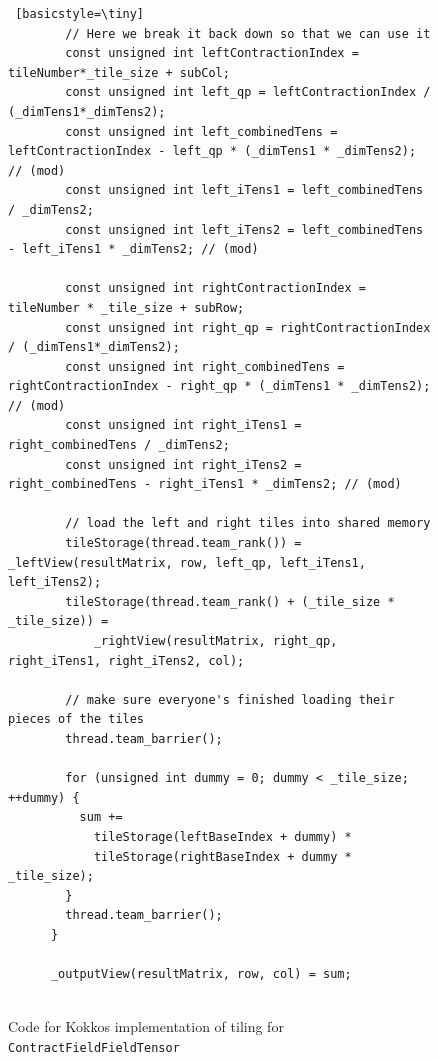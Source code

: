 \begin{figure}[H]
\begin{lstlisting} [basicstyle=\tiny]
        // Here we break it back down so that we can use it
        const unsigned int leftContractionIndex = tileNumber*_tile_size + subCol;
        const unsigned int left_qp = leftContractionIndex / (_dimTens1*_dimTens2);
        const unsigned int left_combinedTens = leftContractionIndex - left_qp * (_dimTens1 * _dimTens2); // (mod)
        const unsigned int left_iTens1 = left_combinedTens / _dimTens2;
        const unsigned int left_iTens2 = left_combinedTens - left_iTens1 * _dimTens2; // (mod)

        const unsigned int rightContractionIndex = tileNumber * _tile_size + subRow; 
        const unsigned int right_qp = rightContractionIndex / (_dimTens1*_dimTens2);
        const unsigned int right_combinedTens = rightContractionIndex - right_qp * (_dimTens1 * _dimTens2); // (mod)
        const unsigned int right_iTens1 = right_combinedTens / _dimTens2;
        const unsigned int right_iTens2 = right_combinedTens - right_iTens1 * _dimTens2; // (mod)

        // load the left and right tiles into shared memory
        tileStorage(thread.team_rank()) = _leftView(resultMatrix, row, left_qp, left_iTens1, left_iTens2);
        tileStorage(thread.team_rank() + (_tile_size * _tile_size)) =
            _rightView(resultMatrix, right_qp, right_iTens1, right_iTens2, col);

        // make sure everyone's finished loading their pieces of the tiles
        thread.team_barrier();

        for (unsigned int dummy = 0; dummy < _tile_size; ++dummy) {
          sum +=
            tileStorage(leftBaseIndex + dummy) *
            tileStorage(rightBaseIndex + dummy * _tile_size);
        }
        thread.team_barrier();
      }
      
      _outputView(resultMatrix, row, col) = sum;
      
 \end{lstlisting}
 \caption[Tiling implementation code]{Code for Kokkos implementation of tiling
     for \texttt{ContractFieldFieldTensor}}
\label{lst:CFFTTilingCode}
\end{figure}
 
 
